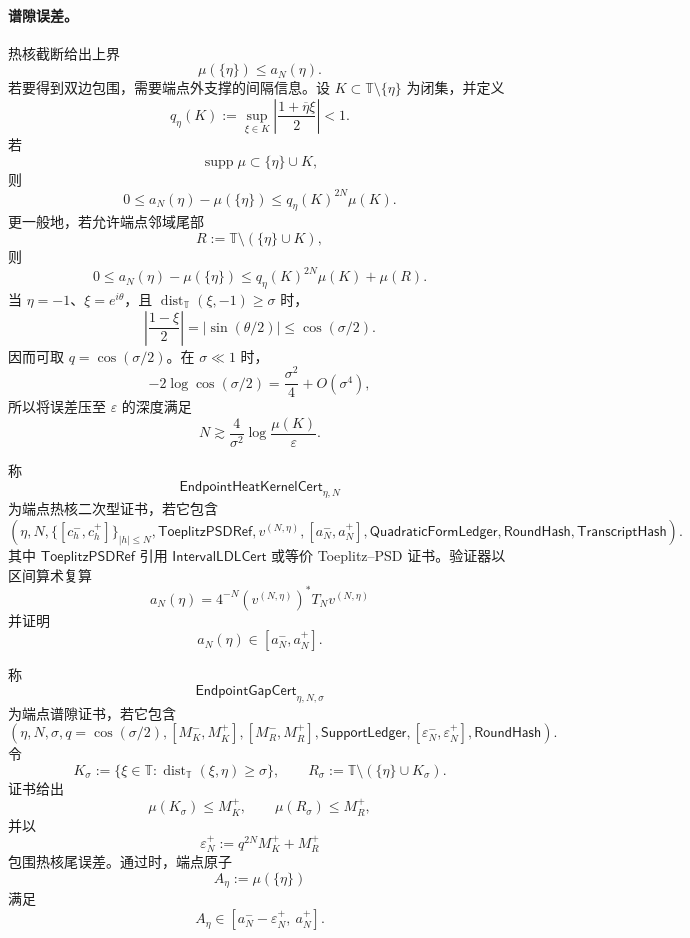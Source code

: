 \paragraph{谱隙误差。}
热核截断给出上界
\[
\mu(\{\eta\})\le a_N(\eta).
\]
若要得到双边包围，需要端点外支撑的间隔信息。设 \(K\subset\mathbb T\setminus\{\eta\}\) 为闭集，并定义
\[
q_\eta(K)
:=
\sup_{\xi\in K}
\left|
\frac{1+\overline{\eta}\xi}{2}
\right|<1.
\]
若
\[
\operatorname{supp}\mu\subset\{\eta\}\cup K,
\]
则
\[
0\le a_N(\eta)-\mu(\{\eta\})
\le
q_\eta(K)^{2N}\mu(K).
\]
更一般地，若允许端点邻域尾部
\[
R:=\mathbb T\setminus(\{\eta\}\cup K),
\]
则
\[
0\le a_N(\eta)-\mu(\{\eta\})
\le
q_\eta(K)^{2N}\mu(K)+\mu(R).
\]
当 \(\eta=-1\)、\(\xi=e^{i\theta}\)，且 \(\operatorname{dist}_{\mathbb T}(\xi,-1)\ge\sigma\) 时，
\[
\left|\frac{1-\xi}{2}\right|
=
|\sin(\theta/2)|
\le
\cos(\sigma/2).
\]
因而可取 \(q=\cos(\sigma/2)\)。在 \(\sigma\ll1\) 时，
\[
-2\log\cos(\sigma/2)
=
\frac{\sigma^2}{4}+O(\sigma^4),
\]
所以将误差压至 \(\varepsilon\) 的深度满足
\[
N\gtrsim
\frac{4}{\sigma^2}\log\frac{\mu(K)}{\varepsilon}.
\]

\begin{definition}[端点热核二次型证书]\label{def:typed-address-biaxial-completion-endpoint-heat-kernel-cert}
称
\[
\mathsf{EndpointHeatKernelCert}_{\eta,N}
\]
为端点热核二次型证书，若它包含
\[
\left(
\eta,N,
\{[c_h^-,c_h^+]\}_{|h|\le N},
\mathsf{ToeplitzPSDRef},
v^{(N,\eta)},
[a_N^-,a_N^+],
\mathsf{QuadraticFormLedger},
\mathsf{RoundHash},
\mathsf{TranscriptHash}
\right).
\]
其中 \(\mathsf{ToeplitzPSDRef}\) 引用 \(\mathsf{IntervalLDLCert}\) 或等价 Toeplitz--PSD 证书。验证器以区间算术复算
\[
a_N(\eta)
=
4^{-N}
\left(v^{(N,\eta)}\right)^*T_Nv^{(N,\eta)}
\]
并证明
\[
a_N(\eta)\in[a_N^-,a_N^+].
\]
\end{definition}

\begin{definition}[端点谱隙证书]\label{def:typed-address-biaxial-completion-endpoint-gap-cert}
称
\[
\mathsf{EndpointGapCert}_{\eta,N,\sigma}
\]
为端点谱隙证书，若它包含
\[
\left(
\eta,N,\sigma,
q=\cos(\sigma/2),
[M_K^-,M_K^+],
[M_R^-,M_R^+],
\mathsf{SupportLedger},
[\varepsilon_N^-,\varepsilon_N^+],
\mathsf{RoundHash}
\right).
\]
令
\[
K_\sigma:=\{\xi\in\mathbb T:
\operatorname{dist}_{\mathbb T}(\xi,\eta)\ge\sigma\},
\qquad
R_\sigma:=\mathbb T\setminus(\{\eta\}\cup K_\sigma).
\]
证书给出
\[
\mu(K_\sigma)\le M_K^+,
\qquad
\mu(R_\sigma)\le M_R^+,
\]
并以
\[
\varepsilon_N^+
:=
q^{2N}M_K^+ + M_R^+
\]
包围热核尾误差。通过时，端点原子
\[
A_\eta:=\mu(\{\eta\})
\]
满足
\[
A_\eta
\in
[a_N^- - \varepsilon_N^+,\ a_N^+].
\]
\end{definition}

